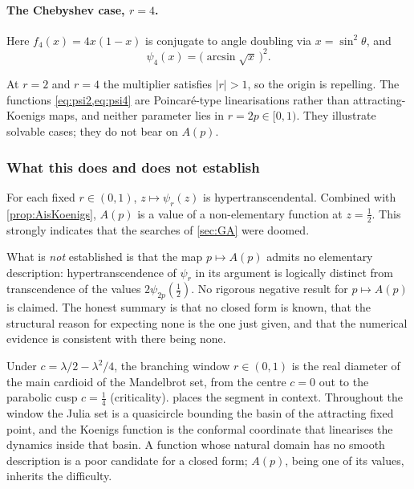 \paragraph{The Chebyshev case, \(r=4\).}
Here \(f_4(x)=4x(1-x)\) is conjugate to angle doubling via \(x=\sin^2\theta\), and
\begin{equation}
\label{eq:psi4}
\psi_4(x) = \bigl(\arcsin\sqrt{x}\,\bigr)^2 .
\end{equation}

\begin{remark}
\label{rem:attractrepel}
At \(r=2\) and \(r=4\) the multiplier satisfies \(|r|>1\), so the origin is repelling. The functions \cref{eq:psi2,eq:psi4} are Poincar\'e-type linearisations rather than attracting-Koenigs maps, and neither parameter lies in \(r=2p\in[0,1)\). They illustrate solvable cases; they do not bear on \(A(p)\).
\end{remark}

\subsubsection*{What this does and does not establish}

For each fixed \(r\in(0,1)\), \(z\mapsto\psi_r(z)\) is hypertranscendental. Combined with \cref{prop:AisKoenigs}, \(A(p)\) is a value of a non-elementary function at \(z=\tfrac12\). This strongly indicates that the searches of \cref{sec:GA} were doomed.

What is \emph{not} established is that the map \(p\mapsto A(p)\) admits no elementary description: hypertranscendence of \(\psi_r\) in its argument is logically distinct from transcendence of the values \(2\psi_{2p}(\tfrac12)\). No rigorous negative result for \(p\mapsto A(p)\) is claimed. The honest summary is that no closed form is known, that the structural reason for expecting none is the one just given, and that the numerical evidence is consistent with there being none.

Under \(c=\lambda/2-\lambda^2/4\), the branching window \(r\in(0,1)\) is the real diameter of the main cardioid of the Mandelbrot set, from the centre \(c=0\) out to the parabolic cusp \(c=\tfrac14\) (criticality).  places the segment in context. Throughout the window the Julia set is a quasicircle bounding the basin of the attracting fixed point, and the Koenigs function is the conformal coordinate that linearises the dynamics inside that basin. A function whose natural domain has no smooth description is a poor candidate for a closed form; \(A(p)\), being one of its values, inherits the difficulty.


